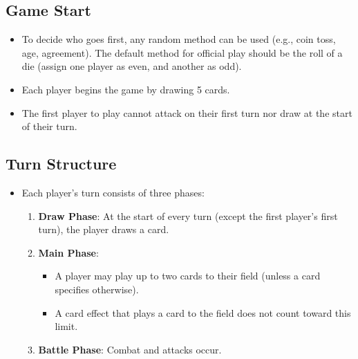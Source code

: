\subsection{Game Start}
\begin{itemize}
    \item To decide who goes first, any random method can be used (e.g., coin toss, age, agreement). The default method for official play should be the roll of a die (assign one player as even, and another as odd).
    \item Each player begins the game by drawing 5 cards.
    \item The first player to play cannot attack on their first turn nor draw at the start of their turn.
\end{itemize}








\subsection{Turn Structure}
\begin{itemize}
\item Each player's turn consists of three phases:
	\begin{enumerate}
	    \item \textbf{Draw Phase}: At the start of every turn (except the first player's first turn), the player draws a card.
	    \item \textbf{Main Phase}:
	    \begin{itemize}
	        \item A player may play up to two cards to their field (unless a card specifies otherwise).
	        \item A card effect that plays a card to the field does not count toward this limit.
	    \end{itemize}
	    \item \textbf{Battle Phase}: Combat and attacks occur.
	\end{enumerate}
\end{itemize}








